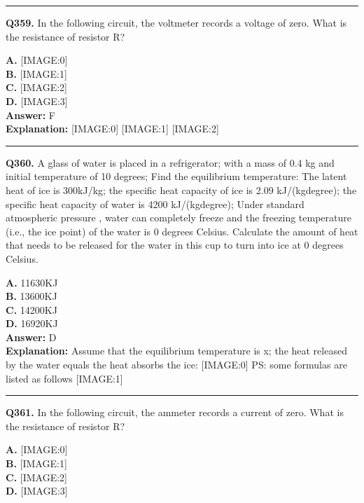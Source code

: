 \documentclass[12pt]{article}
\begin{document}
\hrule
\vspace{1em}


\noindent
\textbf{Q359.} In the following circuit, the voltmeter records a voltage of zero.
What is the resistance of resistor R?



\textbf{A.} [IMAGE:0] \\
\textbf{B.} [IMAGE:1] \\
\textbf{C.} [IMAGE:2] \\
\textbf{D.} [IMAGE:3] \\

\textbf{Answer:} F \\
\textbf{Explanation:} [IMAGE:0]
[IMAGE:1]
[IMAGE:2]

\hrule
\vspace{1em}


\noindent
\textbf{Q360.} A glass of water is placed in a refrigerator; with a mass of 0.4 kg and initial temperature of 10 degrees; Find the equilibrium temperature: The latent heat of ice is 300kJ/kg; the specific heat capacity of ice is 2.09 kJ/(kg\cdot degree); the specific heat capacity of water is 4200 kJ/(kg\cdot degree); Under standard atmospheric pressure , water can completely freeze and the freezing temperature (i.e., the ice point) of the water is 0 degrees Celsius.
Calculate the amount of heat that needs to be released for the water in this cup to turn into ice at 0 degrees Celsius.



\textbf{A.} 11630KJ \\
\textbf{B.} 13600KJ \\
\textbf{C.} 14200KJ \\
\textbf{D.} 16920KJ \\

\textbf{Answer:} D \\
\textbf{Explanation:} Assume that the equilibrium temperature is x; the heat released by the water equals the heat absorbs the ice:
[IMAGE:0]
PS: some formulas are listed as follows
[IMAGE:1]

\hrule
\vspace{1em}


\noindent
\textbf{Q361.} In the following circuit, the ammeter records a current of zero.
What is the resistance of resistor R?



\textbf{A.} [IMAGE:0] \\
\textbf{B.} [IMAGE:1] \\
\textbf{C.} [IMAGE:2] \\
\textbf{D.} [IMAGE:3] \\
\end{document}
